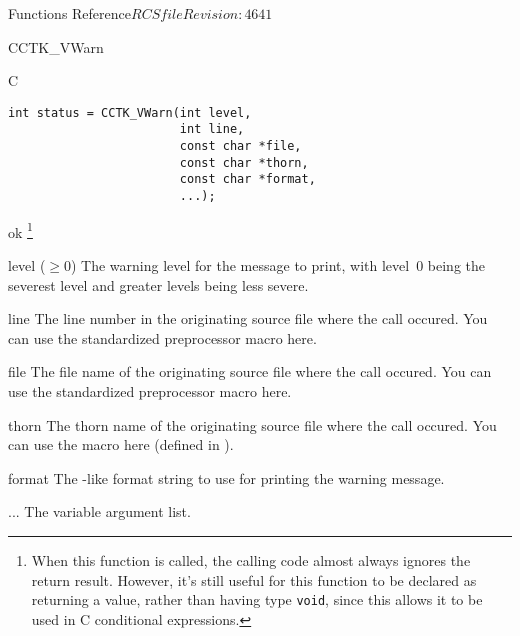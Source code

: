 \begin{cactuspart}{ Functions Reference}{$RCSfile$}{$Revision: 4641 $}
\begin{FunctionDescription}{CCTK\_VWarn}
\begin{SynopsisSection}
\begin{Synopsis}{C}
\begin{verbatim}
int status = CCTK_VWarn(int level,
                        int line,
                        const char *file,
                        const char *thorn,
                        const char *format,
                        ...);
\end{verbatim}
\end{Synopsis}
\end{SynopsisSection}

\begin{ResultSection}
\begin{Result}{0}
ok%
\footnote{%
         When this function is called, the calling code almost
         always ignores the return result.  However, it's still
         useful for this function to be declared as returning a
         value, rather than having type \texttt{void}, since this
         allows it to be used in C conditional expressions.
         }%
\end{Result}
\end{ResultSection}

\begin{ParameterSection}
\begin{Parameter}{level ($\ge 0$)}
The warning level for the message to print, with level~0 being the
severest level and greater levels being less severe.
\end{Parameter}
\begin{Parameter}{line}
The line number in the originating source file where the  call
occured. You can use the standardized  preprocessor macro here.
\end{Parameter}
\begin{Parameter}{file}
The file name of the originating source file where the  call
occured. You can use the standardized  preprocessor macro here.
\end{Parameter}
\begin{Parameter}{thorn}
The thorn name of the originating source file where the  call occured. You can use the  macro here (defined in ).
\end{Parameter}
\begin{Parameter}{format}
The -like format string to use for printing the warning message.
\end{Parameter}
\begin{Parameter}{...}
The variable argument list.
\end{Parameter}
\end{ParameterSection}


\end{FunctionDescription}
\end{cactuspart}
